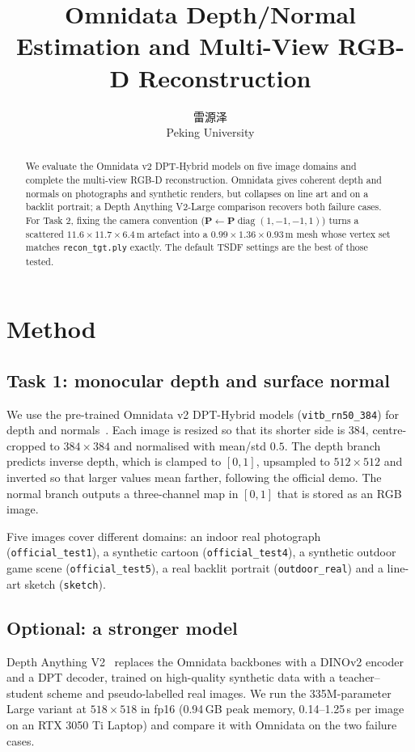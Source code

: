 \documentclass{article}
\title{Omnidata Depth/Normal Estimation and Multi-View RGB-D Reconstruction}
\author{%
  雷源泽 \quad 2510124204\\
  Peking University
}
\begin{document}
\maketitle

\begin{abstract}
We evaluate the Omnidata v2 DPT-Hybrid models on five image domains and complete the multi-view RGB-D reconstruction. Omnidata gives coherent depth and normals on photographs and synthetic renders, but collapses on line art and on a backlit portrait; a Depth Anything V2-Large comparison recovers both failure cases. For Task 2, fixing the camera convention ($\mathbf{P}\leftarrow\mathbf{P}\operatorname{diag}(1,-1,-1,1)$) turns a scattered $11.6\times11.7\times6.4$\,m artefact into a $0.99\times1.36\times0.93$\,m mesh whose vertex set matches \texttt{recon\_tgt.ply} exactly. The default TSDF settings are the best of those tested.
\end{abstract}

\section{Method}\label{sec:method}

\subsection{Task 1: monocular depth and surface normal}
We use the pre-trained Omnidata v2 DPT-Hybrid models (\texttt{vitb\_rn50\_384}) for depth and normals~\citep{eftekhar2021omnidata}. Each image is resized so that its shorter side is 384, centre-cropped to $384\times384$ and normalised with mean/std $0.5$. The depth branch predicts inverse depth, which is clamped to $[0,1]$, upsampled to $512\times512$ and inverted so that larger values mean farther, following the official demo. The normal branch outputs a three-channel map in $[0,1]$ that is stored as an RGB image.

Five images cover different domains: an indoor real photograph (\texttt{official\_test1}), a synthetic cartoon (\texttt{official\_test4}), a synthetic outdoor game scene (\texttt{official\_test5}), a real backlit portrait (\texttt{outdoor\_real}) and a line-art sketch (\texttt{sketch}).

\subsection{Optional: a stronger model}
Depth Anything V2~\citep{yang2024depthanythingv2} replaces the Omnidata backbones with a DINOv2 encoder and a DPT decoder, trained on high-quality synthetic data with a teacher--student scheme and pseudo-labelled real images. We run the 335M-parameter Large variant at $518\times518$ in fp16 (0.94\,GB peak memory, 0.14--1.25\,s per image on an RTX 3050 Ti Laptop) and compare it with Omnidata on the two failure cases.
\end{document}
